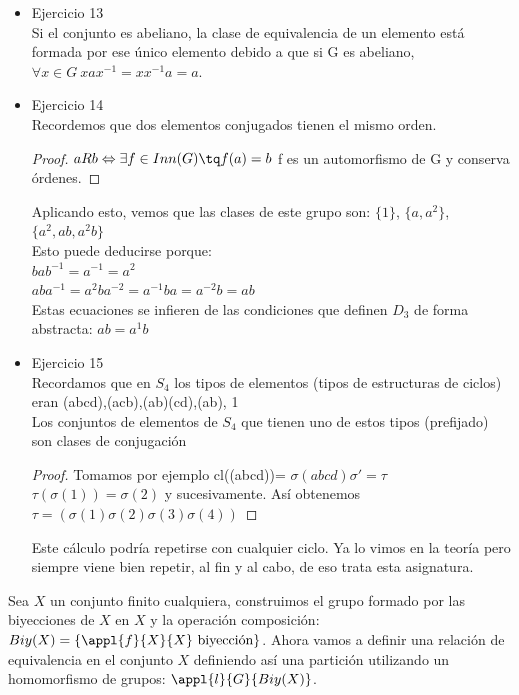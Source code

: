 \documentclass[nochap]{apuntes}
\begin{document}
\begin{itemize}
 \item Ejercicio 13\\
 Si el conjunto es abeliano, la clase de equivalencia de un elemento está formada por ese único elemento debido a que si G es abeliano,
 $\forall x \in G \ xax^{-1}=xx^{-1}a=a$.\
 
 \item Ejercicio 14\\
 Recordemos que dos elementos conjugados tienen el mismo orden.
 \begin{proof}
  $aRb \Leftrightarrow \exists f \in Inn(G) \tq f(a)=b$  f es un automorfismo de G y conserva órdenes.
 \end{proof}
 Aplicando esto, vemos que las clases de este grupo son: $\{1\}$, $\{a, a^{2}\}$, $\{a^{2}, ab, a^{2}b\}$\\
 Esto puede deducirse porque:\\
 $bab^{-1}=a^{-1}=a^{2}$\\
 $aba^{-1}=a^{2}ba^{-2}=a^{-1}ba=a^{-2}b=ab$\\
 Estas ecuaciones se infieren de las condiciones que definen $D_3$ de forma abstracta: $ab=a^{1}b$\\
 
 \item Ejercicio 15\\
 Recordamos que en $S_4$  los tipos de elementos (tipos de estructuras de ciclos) eran (abcd),(acb),(ab)(cd),(ab), 1\\
 Los conjuntos de elementos de $S_4$  que tienen uno de estos tipos (prefijado) son clases de conjugación\\
 \begin{proof}
  Tomamos por ejemplo cl((abcd))= $\sigma (abcd) \sigma'= \tau$\\
  $\tau(\sigma(1))=\sigma(2)$  y sucesivamente. Así obtenemos
  $\tau = (\sigma(1)\sigma(2)\sigma(3)\sigma(4))$
 \end{proof}

 Este cálculo podría repetirse con cualquier ciclo. Ya lo vimos en la teoría pero siempre viene bien repetir, al fin y al cabo, de eso trata esta asignatura.
\end{itemize}

Sea $X$ un conjunto finito cualquiera, construimos el grupo formado por las biyecciones de $X$ en $X$ y la operación composición: $Biy(X) = \{\appl{f}{X}{X}\ \text{biyección}\}$. Ahora vamos a definir una relación de equivalencia en el conjunto $X$ definiendo así una partición utilizando un homomorfismo de grupos: $\appl{l}{G}{Biy(X)}$.\\
\end{document}
